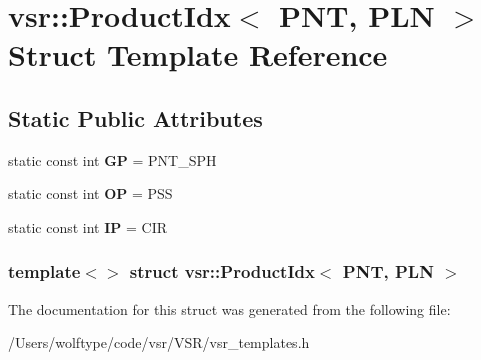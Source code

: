 \hypertarget{structvsr_1_1_product_idx_3_01_p_n_t_00_01_p_l_n_01_4}{\section{vsr\-:\-:Product\-Idx$<$ P\-N\-T, P\-L\-N $>$ Struct Template Reference}
\label{structvsr_1_1_product_idx_3_01_p_n_t_00_01_p_l_n_01_4}
}
\subsection*{Static Public Attributes}
\begin{DoxyCompactItemize}
\item 
\hypertarget{structvsr_1_1_product_idx_3_01_p_n_t_00_01_p_l_n_01_4_a184f6d54637817ff177b8d8c9b606e33}{static const int {\bfseries G\-P} = P\-N\-T\-\_\-\-S\-P\-H}\label{structvsr_1_1_product_idx_3_01_p_n_t_00_01_p_l_n_01_4_a184f6d54637817ff177b8d8c9b606e33}

\item 
\hypertarget{structvsr_1_1_product_idx_3_01_p_n_t_00_01_p_l_n_01_4_ae0212bf84774837ebdcede809e3c4907}{static const int {\bfseries O\-P} = P\-S\-S}\label{structvsr_1_1_product_idx_3_01_p_n_t_00_01_p_l_n_01_4_ae0212bf84774837ebdcede809e3c4907}

\item 
\hypertarget{structvsr_1_1_product_idx_3_01_p_n_t_00_01_p_l_n_01_4_a4110c9500d0852aea67a3853761766ba}{static const int {\bfseries I\-P} = C\-I\-R}\label{structvsr_1_1_product_idx_3_01_p_n_t_00_01_p_l_n_01_4_a4110c9500d0852aea67a3853761766ba}

\end{DoxyCompactItemize}
\subsubsection*{template$<$$>$ struct vsr\-::\-Product\-Idx$<$ P\-N\-T, P\-L\-N $>$}



The documentation for this struct was generated from the following file\-:\begin{DoxyCompactItemize}
\item 
/\-Users/wolftype/code/vsr/\-V\-S\-R/vsr\-\_\-templates.\-h\end{DoxyCompactItemize}
